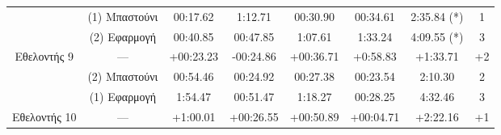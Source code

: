 \begin{table}[!h]
{\begin{tabular}{c|c|c|c|c|c|c|c}
            & (1) Μπαστούνι & 00:17.62 & 1:12.71 & 00:30.90 & 00:34.61 & 2:35.84 (*) & 1 \\
        \rowcolor[HTML]{EFEFEF}
        \cellcolor[HTML]{FFFFFF} & (2) Εφαρμογή  & 00:40.85 & 00:47.85 & 1:07.61 & 1:33.24 & 4:09.55 (*) & 3 \\
        \multirow{-3}{*}{Εθελοντής 9} & ---  & \cellcolor[HTML]{FD6864}+00:23.23 & \cellcolor[HTML]{9AFF99}-00:24.86 & \cellcolor[HTML]{FD6864}+00:36.71 & \cellcolor[HTML]{FD6864}+0:58.83 & \cellcolor[HTML]{FD6864}+1:33.71 & \cellcolor[HTML]{FD6864}+2 \\ \hline
    
            & (2) Μπαστούνι & 00:54.46 & 00:24.92 & 00:27.38 & 00:23.54 & 2:10.30 & 2 \\
        \rowcolor[HTML]{EFEFEF}
        \cellcolor[HTML]{FFFFFF} & (1) Εφαρμογή  & 1:54.47 & 00:51.47 & 1:18.27 & 00:28.25 & 4:32.46 & 3 \\
        \multirow{-3}{*}{Εθελοντής 10} & ---  & \cellcolor[HTML]{FD6864}+1:00.01 & \cellcolor[HTML]{FD6864}+00:26.55 & \cellcolor[HTML]{FD6864}+00:50.89 & \cellcolor[HTML]{FD6864}+00:04.71 & \cellcolor[HTML]{FD6864}+2:22.16 & \cellcolor[HTML]{FD6864}+1 \\ \hline
    \end{tabular}%
    }
\end{table}